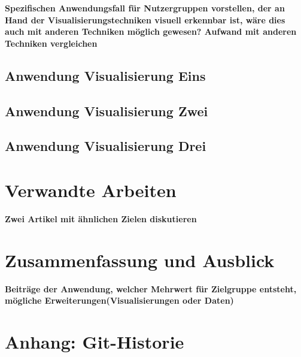 \documentclass[usegeometry=true]{scrartcl}
\begin{document}
\textbf{Spezifischen Anwendungsfall für Nutzergruppen vorstellen, der an Hand der Visualisierungstechniken visuell erkennbar ist, wäre dies auch mit anderen Techniken möglich gewesen? Aufwand mit anderen Techniken vergleichen}
\subsection{Anwendung Visualisierung Eins}
\subsection{Anwendung Visualisierung Zwei}
\subsection{Anwendung Visualisierung Drei}

\section{Verwandte Arbeiten}
\textbf{Zwei Artikel mit ähnlichen Zielen diskutieren}
\section{Zusammenfassung und Ausblick}

\textbf{Beiträge der Anwendung, welcher Mehrwert für Zielgruppe entsteht, mögliche Erweiterungen(Visualisierungen oder Daten)}

\newpage

\setcounter{page}{4}
\section*{Anhang: Git-Historie}

\printbibliography
\end{document}
